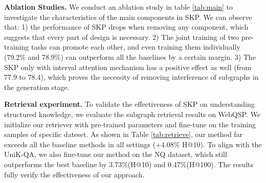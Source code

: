 \documentclass[sigconf,natbib=true,anonymous=False]{acmart}
\begin{document}
\begin{table}[t]
  \centering
  \caption{The subgraph retrieval results on WebQSP test set. The content in parentheses is the specific dataset fine-tuned by retriever. We contacted \citeauthor{oguz2020unik} to get the retrieval result of UniK-QA.}
  \label{tab:retrieve}
  \vspace{-0.6cm}
  
\end{table}
\textbf{Ablation Studies.} We conduct an ablation study in table \ref{tab:main} to investigate the characteristics of the main components in SKP.  We can observe that: 1) the performance of SKP drops when removing any component, which suggests that every part of design is necessary. 2) The joint training of two pre-training tasks can promote each other, and even training them individually (79.2\% and 78.9\%) can outperform all the baselines by a certain margin. 3) The SKP only with interval attention mechanism has a positive effect as well (from 77.9 to 78.4), which proves the necessity of removing interference of subgraphs in the generation stage.


\textbf{Retrieval experiment.} To validate the effectiveness of SKP on understanding structured knowledge, we evaluate the subgraph retrieval results on WebQSP. We initialize our retriever with pre-trained parameters and fine-tune on the training samples of specific dateset. As shown in Table \ref{tab:retrieve}, our method far exceeds all the baseline methods in all settings (+4.08\% H@10). To align with the UniK-QA, we also fine-tune our method on the NQ dataset, which still outperforms the best baseline by 3.73\%(H@10) and 0.47\%(H@100). The results fully verify the effectiveness of our approach.
\end{document}
